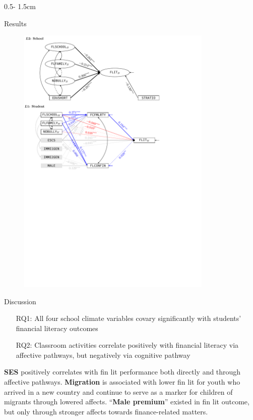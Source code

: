 \documentclass{uioposter}
\begin{document}
\begin{frame}
\begin{columns}[onlytextwidth]
\begin{column}{0.5\textwidth - 1.5cm}
    \begin{block}{Results}
        \vspace{-1.2cm}
        \begin{figure}
            \includegraphics[width=0.83\textwidth]{../Figures/Poster_result.pdf}
        \end{figure}
        \vspace{-0.6cm}
    \end{block}

    \begin{block}{Discussion}
        \begin{enumerate}
            \item[RQ1:] All four school climate variables covary significantly with students' financial literacy outcomes
            \item[RQ2:] Classroom activities correlate positively with financial literacy via affective pathways, but negatively via cognitive pathway
        \end{enumerate}

        \textbf{SES} positively correlates with fin lit performance both directly and through affective pathways. \textbf{Migration} is associated with lower fin lit for youth who arrived in a new country and continue to serve as a marker for children of migrants through lowered affects. ``\textbf{Male premium}'' existed in fin lit outcome, but only through stronger affects towards finance-related matters.
    \end{block}


\end{column}
\end{columns}
\end{frame}
\end{document}
